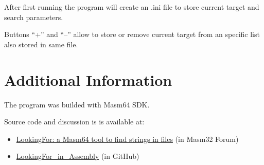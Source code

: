 \documentclass[11pt,a4paper]{scrartcl}
\begin{document}
	After first running the program will create an .ini file to store current target and search parameters.
	
	Buttons ``+'' and ``--'' allow to store or remove current target from an specific list also stored in same file. 

\section{Additional Information}

	The program was builded with Masm64 SDK.
	
	Source code and discussion is is available at:
    \begin{itemize}
	
	\item \href{https://masm32.com/board/index.php?topic=11888.0}{LookingFor: a Masm64 tool to find strings in files} (in Masm32 Forum) 
	\item \href{https://github.com/ASMHSE/LookingFor-in-Assembly}{LookingFor\_in\_Assembly} (in GitHub) 
     \end{itemize}
	

\thispagestyle{empty}
\end{document}
